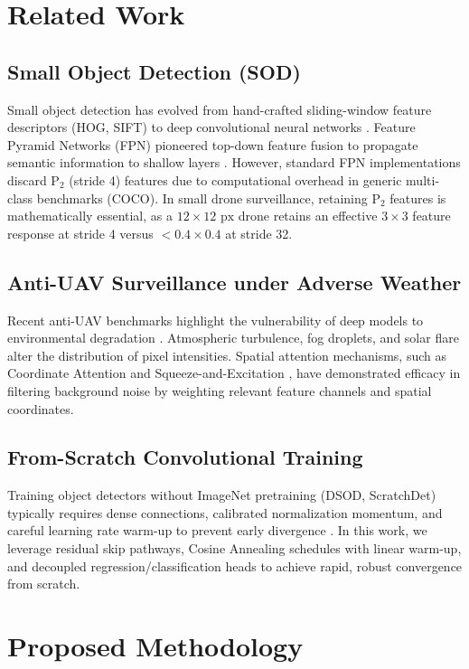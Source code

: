 \documentclass[10pt,conference,letterpaper,twocolumn]{article}
\begin{document}
\section{Related Work}
\subsection{Small Object Detection (SOD)}
Small object detection has evolved from hand-crafted sliding-window feature descriptors (HOG, SIFT) to deep convolutional neural networks \cite{girshick2015fast, lin2017feature}. Feature Pyramid Networks (FPN) pioneered top-down feature fusion to propagate semantic information to shallow layers \cite{lin2017feature}. However, standard FPN implementations discard $\text{P}_2$ (stride 4) features due to computational overhead in generic multi-class benchmarks (COCO). In small drone surveillance, retaining $\text{P}_2$ features is mathematically essential, as a $12\times 12\text{ px}$ drone retains an effective $3\times 3$ feature response at stride 4 versus $<0.4\times 0.4$ at stride 32.

\subsection{Anti-UAV Surveillance under Adverse Weather}
Recent anti-UAV benchmarks highlight the vulnerability of deep models to environmental degradation \cite{anti_uav_bench2022, zhang2023drone}. Atmospheric turbulence, fog droplets, and solar flare alter the distribution of pixel intensities. Spatial attention mechanisms, such as Coordinate Attention \cite{hou2021coordinate} and Squeeze-and-Excitation \cite{hu2018squeeze}, have demonstrated efficacy in filtering background noise by weighting relevant feature channels and spatial coordinates.

\subsection{From-Scratch Convolutional Training}
Training object detectors without ImageNet pretraining (DSOD, ScratchDet) typically requires dense connections, calibrated normalization momentum, and careful learning rate warm-up to prevent early divergence \cite{zhu2019scratchdet}. In this work, we leverage residual skip pathways, Cosine Annealing schedules with linear warm-up, and decoupled regression/classification heads to achieve rapid, robust convergence from scratch.

\section{Proposed Methodology}
\end{document}
